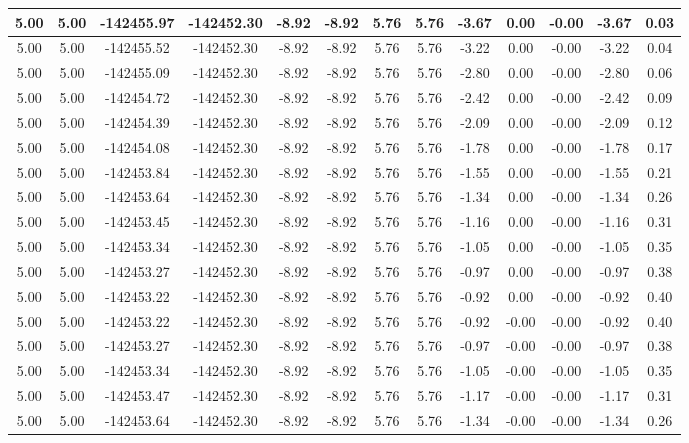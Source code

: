 \begin{table}[htbp]
\begin{adjustbox}{angle=90}
\begin{tabular}{|c|c|c|c|c|c|c|c|c|c|c|c|c|}
 5.00 & 5.00 & -142455.97 & -142452.30 & -8.92 & -8.92 & 5.76 & 5.76 & -3.67 & 0.00 & -0.00 & -3.67 & 0.03\\ \hline
 5.00 & 5.00 & -142455.52 & -142452.30 & -8.92 & -8.92 & 5.76 & 5.76 & -3.22 & 0.00 & -0.00 & -3.22 & 0.04\\ \hline
 5.00 & 5.00 & -142455.09 & -142452.30 & -8.92 & -8.92 & 5.76 & 5.76 & -2.80 & 0.00 & -0.00 & -2.80 & 0.06\\ \hline
 5.00 & 5.00 & -142454.72 & -142452.30 & -8.92 & -8.92 & 5.76 & 5.76 & -2.42 & 0.00 & -0.00 & -2.42 & 0.09\\ \hline
 5.00 & 5.00 & -142454.39 & -142452.30 & -8.92 & -8.92 & 5.76 & 5.76 & -2.09 & 0.00 & -0.00 & -2.09 & 0.12\\ \hline
 5.00 & 5.00 & -142454.08 & -142452.30 & -8.92 & -8.92 & 5.76 & 5.76 & -1.78 & 0.00 & -0.00 & -1.78 & 0.17\\ \hline
 5.00 & 5.00 & -142453.84 & -142452.30 & -8.92 & -8.92 & 5.76 & 5.76 & -1.55 & 0.00 & -0.00 & -1.55 & 0.21\\ \hline
 5.00 & 5.00 & -142453.64 & -142452.30 & -8.92 & -8.92 & 5.76 & 5.76 & -1.34 & 0.00 & -0.00 & -1.34 & 0.26\\ \hline
 5.00 & 5.00 & -142453.45 & -142452.30 & -8.92 & -8.92 & 5.76 & 5.76 & -1.16 & 0.00 & -0.00 & -1.16 & 0.31\\ \hline
 5.00 & 5.00 & -142453.34 & -142452.30 & -8.92 & -8.92 & 5.76 & 5.76 & -1.05 & 0.00 & -0.00 & -1.05 & 0.35\\ \hline
 5.00 & 5.00 & -142453.27 & -142452.30 & -8.92 & -8.92 & 5.76 & 5.76 & -0.97 & 0.00 & -0.00 & -0.97 & 0.38\\ \hline
 5.00 & 5.00 & -142453.22 & -142452.30 & -8.92 & -8.92 & 5.76 & 5.76 & -0.92 & 0.00 & -0.00 & -0.92 & 0.40\\ \hline
 5.00 & 5.00 & -142453.22 & -142452.30 & -8.92 & -8.92 & 5.76 & 5.76 & -0.92 & -0.00 & -0.00 & -0.92 & 0.40\\ \hline
 5.00 & 5.00 & -142453.27 & -142452.30 & -8.92 & -8.92 & 5.76 & 5.76 & -0.97 & -0.00 & -0.00 & -0.97 & 0.38\\ \hline
 5.00 & 5.00 & -142453.34 & -142452.30 & -8.92 & -8.92 & 5.76 & 5.76 & -1.05 & -0.00 & -0.00 & -1.05 & 0.35\\ \hline
 5.00 & 5.00 & -142453.47 & -142452.30 & -8.92 & -8.92 & 5.76 & 5.76 & -1.17 & -0.00 & -0.00 & -1.17 & 0.31\\ \hline
 5.00 & 5.00 & -142453.64 & -142452.30 & -8.92 & -8.92 & 5.76 & 5.76 & -1.34 & -0.00 & -0.00 & -1.34 & 0.26\\ \hline

\end{tabular}
\end{adjustbox}
\end{table}
